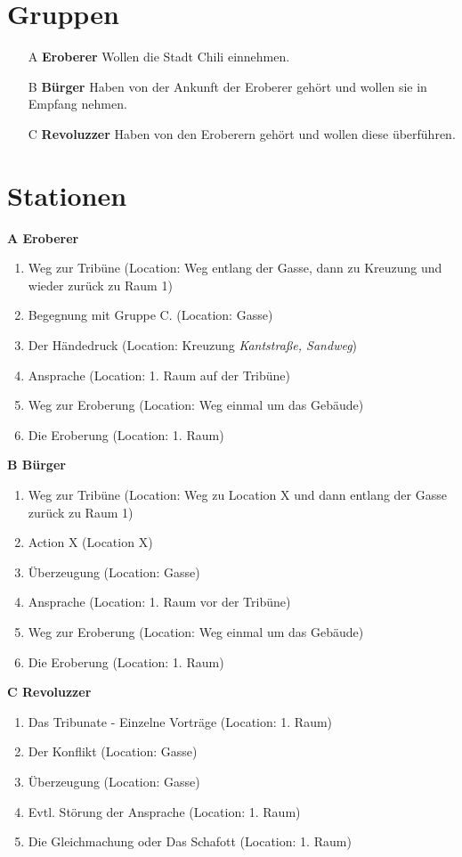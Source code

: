\documentclass[a4paper, 12pt]{report}
\begin{document}
\section*{Gruppen}
\begin{itemize}
    \item[A] \textbf{Eroberer} Wollen die Stadt Chili einnehmen.
    \item[B] \textbf{Bürger} Haben von der Ankunft der Eroberer gehört und wollen sie in Empfang nehmen.
    \item[C] \textbf{Revoluzzer} Haben von den Eroberern gehört und wollen diese überführen.
\end{itemize}

\section*{Stationen}
\textbf{A Eroberer}
\begin{enumerate}
    \item Weg zur Tribüne (Location: Weg entlang der Gasse, dann zu Kreuzung und wieder zurück zu Raum 1)
    \item Begegnung mit Gruppe C. (Location: Gasse)
    \item Der Händedruck (Location: Kreuzung \textit{Kantstraße, Sandweg})
    \item Ansprache (Location: 1. Raum auf der Tribüne)
    \item Weg zur Eroberung (Location: Weg einmal um das Gebäude)
    \item Die Eroberung (Location: 1. Raum)
\end{enumerate}
\textbf{B Bürger}
\begin{enumerate}
    \item Weg zur Tribüne (Location: Weg zu Location X und dann entlang der Gasse zurück zu Raum 1)
    \item Action X (Location X)
    \item Überzeugung (Location: Gasse)
    \item Ansprache (Location: 1. Raum vor der Tribüne)
    \item Weg zur Eroberung (Location: Weg einmal um das Gebäude)
    \item Die Eroberung (Location: 1. Raum)
\end{enumerate}
\textbf{C Revoluzzer}
\begin{enumerate}
    \item Das Tribunate - Einzelne Vorträge (Location: 1. Raum)
    \item Der Konflikt (Location: Gasse)
    \item Überzeugung (Location: Gasse)
    \item Evtl. Störung der Ansprache (Location: 1. Raum)
    \item Die Gleichmachung oder Das Schafott  (Location: 1. Raum)
\end{enumerate}
\end{document}
